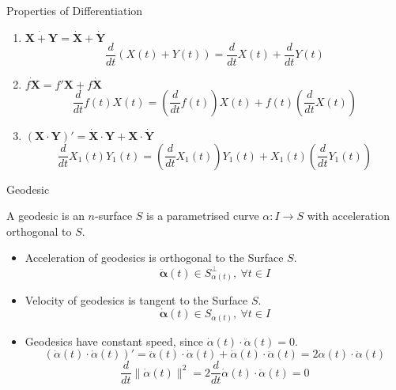 \documentclass{beamer}
\begin{document}
\begin{frame}{Properties of Differentiation}
\begin{enumerate}
	\item $\dot{\mathbf{X}+\mathbf{Y}} = \dot{\mathbf{X}} + \dot{\mathbf{Y}}$
	$$\dfrac{d}{dt} (X(t)+Y(t)) = \dfrac{d}{dt}X(t) + \dfrac{d}{dt}Y(t)$$

	\item $\dot{f\mathbf{X}} = f'\mathbf{X} + f\dot{\mathbf{X}}$
	$$\dfrac{d}{dt}f(t)X(t) = \left( \dfrac{d}{dt}f(t) \right) X(t) + f(t) \left( \dfrac{d}{dt}X(t) \right)$$
\item $(\mathbf{X} \cdot \mathbf{Y})' = \dot{\mathbf{X}} \cdot \mathbf{Y} + \mathbf{X} \cdot \dot{\mathbf{Y}}$
	$$\dfrac{d}{dt}X_1(t)Y_1(t) = \left( \dfrac{d}{dt}X_1(t) \right) Y_1(t) + X_1(t) \left( \dfrac{d}{dt} Y_1(t) \right)$$
\end{enumerate}
\end{frame}

\begin{frame}{Geodesic}
\begin{definition}[Geodesic]
	A geodesic is an $n$-surface $S$ is a parametrised curve $\alpha : I \to S$ with acceleration orthogonal to $S$. 
\end{definition}
\begin{itemize}
	\item Acceleration of geodesics is orthogonal to the Surface $S$.
$$\ddot{\boldsymbol{\alpha}}(t) \in S_{\alpha(t)}^\perp,\ \forall t \in I$$
	\item Velocity of geodesics is tangent to the Surface $S$.
	$$\dot{\boldsymbol{\alpha}}(t) \in S_{\alpha(t)},\ \forall t \in I$$
	\item Geodesics have constant speed, since $\dot{\alpha}(t) \cdot \ddot{\alpha}(t) = 0$.
		$$\left( \dot{\alpha}(t) \cdot \dot{\alpha}(t) \right)' = \ddot{\alpha}(t) \cdot \dot{\alpha}(t) + \dot{\alpha}(t) \cdot \ddot{\alpha}(t) = 2 \dot{\alpha}(t) \cdot \ddot{\alpha}(t) $$
		$$\dfrac{d}{dt} \| \dot{\alpha}(t) \|^2 = 2 \dfrac{d}{dt} \dot{\alpha}(t) \cdot \ddot{\alpha}(t) = 0$$
\end{itemize}
\end{frame}
\end{document}
